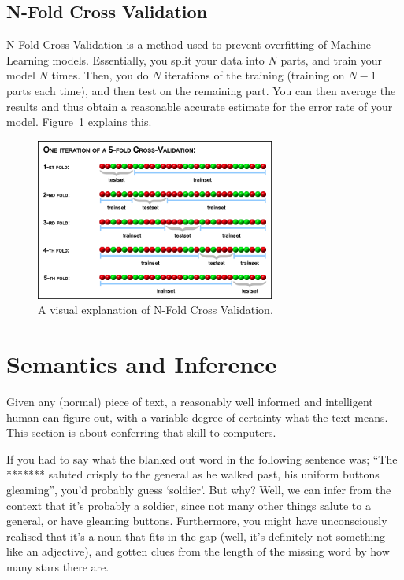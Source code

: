 \subsection{N-Fold Cross Validation}

N-Fold Cross Validation is a method used to prevent overfitting of Machine
Learning models. Essentially, you split your data into $N$ parts, and train your
model $N$ times. Then, you do $N$ iterations of the training (training on $N-1$
parts each time), and then test on the remaining part. You can then average the
results and thus obtain a reasonable accurate estimate for the error rate of
your model. Figure~\ref{fig:cross-validation} explains this.

\begin{figure}[h]
  \centering
  \includegraphics[width=0.7\textwidth]{images/cross-validation}
  \caption{A visual explanation of N-Fold Cross Validation.}
  \label{fig:cross-validation}
\end{figure}

\section{Semantics and Inference}

Given any (normal) piece of text, a reasonably well informed and intelligent
human can figure out, with a variable degree of certainty what the text means.
This section is about conferring that skill to computers.

If you had to say what the blanked out word in the following sentence was; ``The
******* saluted crisply to the general as he walked past, his uniform buttons
gleaming'', you'd probably guess `soldier'. But why? Well, we can infer from the
context that it's probably a soldier, since not many other things salute to a
general, or have gleaming buttons. Furthermore, you might have unconsciously
realised that it's a noun that fits in the gap (well, it's definitely not
something like an adjective), and gotten clues from the length of the missing
word by how many stars there are.

